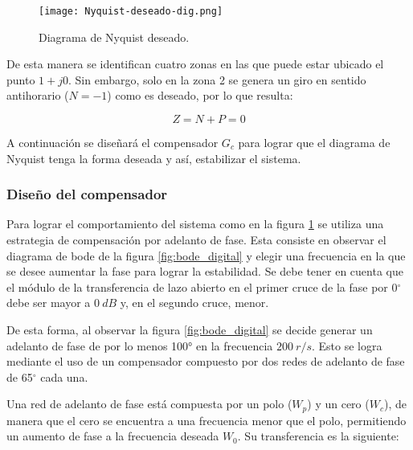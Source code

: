 \begin{figure}[H]
	\centering
	\texttt{[image: Nyquist-deseado-dig.png]}
	\caption{Diagrama de Nyquist deseado.}
	\label{fig:nyquist-deseado-dig}
\end{figure}

De esta manera se identifican cuatro zonas en las que puede estar ubicado el punto $1+j0$. Sin embargo, solo en la zona 2 se genera un giro en sentido antihorario ($N=-1$) como es deseado, por lo que resulta:

\begin{equation*}
	Z = N + P = 0
\end{equation*}


A continuación se diseñará el compensador $G_c$ para lograr que el diagrama de Nyquist tenga la forma deseada y así, estabilizar el sistema.

\subsubsection{Diseño del compensador}

Para lograr el comportamiento del sistema como en la figura 	\ref{fig:nyquist-deseado-dig} se utiliza una estrategia de compensación por adelanto de fase. Esta consiste en observar el diagrama de bode de la figura \ref{fig:bode_digital} y elegir una frecuencia en la que se desee aumentar la fase para lograr la estabilidad. Se debe tener en cuenta que el módulo de la transferencia de lazo abierto en el primer cruce de la fase por 0$\mathrm{{}^\circ}$ debe ser mayor a $0\:dB$ y, en el segundo cruce, menor. 

De esta forma, al observar la figura \ref{fig:bode_digital} se decide generar un adelanto de fase de por lo menos 100° en la frecuencia $200\:r/s$. Esto se logra mediante el uso de un compensador compuesto por dos redes de adelanto de fase de 65$\mathrm{{}^\circ}$ cada una. 

Una red de adelanto de fase está compuesta por un polo ($W_p$) y un cero ($W_c$), de manera que el cero se encuentra a una frecuencia menor que el polo, permitiendo un aumento de fase a la frecuencia deseada $W_0$. Su transferencia es la siguiente:

